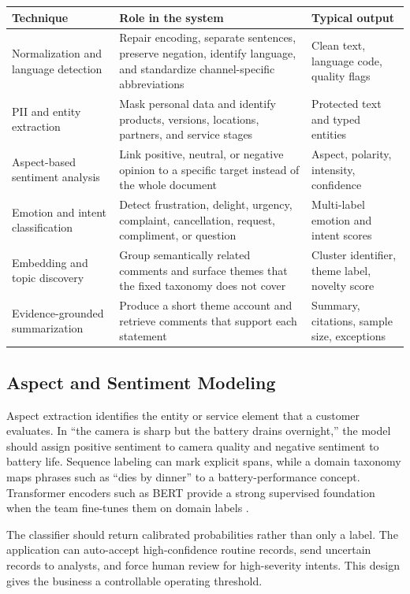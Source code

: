 \documentclass[11pt,a4paper,twoside]{article}
\begin{document}
\begin{tabularx}{\textwidth}{|>{\raggedright\arraybackslash}p{3.15cm}|Y|Y|}
\hline
\textbf{Technique} & \textbf{Role in the system} & \textbf{Typical output} \\ \hline
Normalization and language detection & Repair encoding, separate sentences, preserve negation, identify language, and standardize channel-specific abbreviations & Clean text, language code, quality flags \\ \hline
PII and entity extraction & Mask personal data and identify products, versions, locations, partners, and service stages & Protected text and typed entities \\ \hline
Aspect-based sentiment analysis & Link positive, neutral, or negative opinion to a specific target instead of the whole document \cite{hu2004,pontiki2014} & Aspect, polarity, intensity, confidence \\ \hline
Emotion and intent classification & Detect frustration, delight, urgency, complaint, cancellation, request, compliment, or question & Multi-label emotion and intent scores \\ \hline
Embedding and topic discovery & Group semantically related comments and surface themes that the fixed taxonomy does not cover & Cluster identifier, theme label, novelty score \\ \hline
Evidence-grounded summarization & Produce a short theme account and retrieve comments that support each statement & Summary, citations, sample size, exceptions \\ \hline
\end{tabularx}

\subsection{Aspect and Sentiment Modeling}

Aspect extraction identifies the entity or service element that a customer evaluates. In ``the camera is sharp but the battery drains overnight,'' the model should assign positive sentiment to camera quality and negative sentiment to battery life. Sequence labeling can mark explicit spans, while a domain taxonomy maps phrases such as ``dies by dinner'' to a battery-performance concept. Transformer encoders such as BERT provide a strong supervised foundation when the team fine-tunes them on domain labels \cite{devlin2019}.

The classifier should return calibrated probabilities rather than only a label. The application can auto-accept high-confidence routine records, send uncertain records to analysts, and force human review for high-severity intents. This design gives the business a controllable operating threshold.
\end{document}
